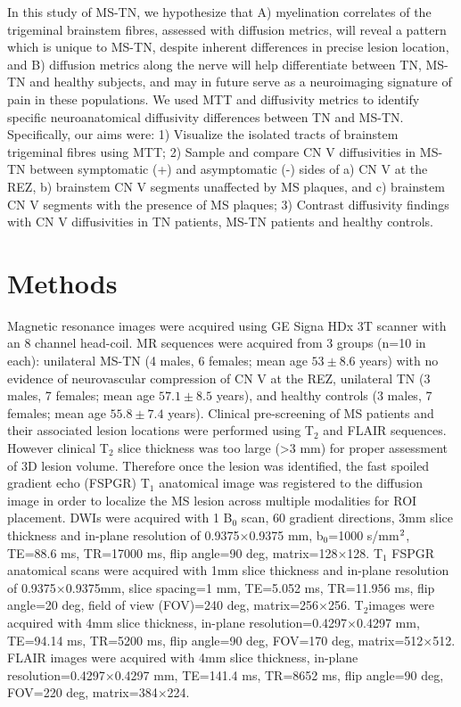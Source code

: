 In this study of MS-TN, we hypothesize that A) myelination correlates of the trigeminal brainstem fibres, assessed with diffusion metrics, will reveal a pattern which is unique to MS-TN, despite inherent differences in precise lesion location, and B) diffusion metrics along the nerve will help differentiate between TN, MS-TN and healthy subjects, and may in future serve as a neuroimaging signature of pain in these populations. 
We used MTT and diffusivity metrics to identify specific neuroanatomical diffusivity differences between TN and MS-TN. Specifically, our aims were: 1) Visualize the isolated tracts of brainstem trigeminal fibres using MTT; 2) Sample and compare CN V diffusivities in MS-TN between symptomatic (+) and asymptomatic (-) sides of a) CN V at the REZ, b) brainstem CN V segments unaffected by MS plaques, and c) brainstem CN V segments with the presence of MS plaques; 3) Contrast diffusivity findings with CN V diffusivities in TN patients, MS-TN patients and healthy controls.

\section{Methods}

Magnetic resonance images were acquired using GE Signa HDx 3T scanner with an 8 channel head-coil. MR sequences were acquired from 3 groups (n=10 in each): unilateral MS-TN (4 males, 6 females; mean age  $53\pm8.6$ years) with no evidence of neurovascular compression of CN V at the REZ, unilateral TN (3 males, 7 females; mean age $57.1\pm8.5$ years), and healthy controls (3 males, 7 females; mean age $55.8\pm7.4$ years). Clinical pre-screening of MS patients and their associated lesion locations were performed using T$_{2}$ and FLAIR sequences. However clinical T$_{2}$ slice thickness was too large (\textgreater 3 mm) for proper assessment of 3D lesion volume. Therefore once the lesion was identified, the fast spoiled gradient echo (FSPGR) T$_{1}$ anatomical image was registered to the diffusion image in order to localize the MS lesion across multiple modalities for ROI placement. DWIs were acquired with 1 B$_{0}$ scan, 60 gradient directions, 3mm slice thickness and in-plane resolution of 0.9375$\times$0.9375 mm, b$_{0}$=1000 s/mm$\textsuperscript{2}$, TE=88.6 ms, TR=17000 ms, flip angle=90 deg, matrix=128$\times$128. T$_{1}$ FSPGR anatomical scans were acquired with 1mm slice thickness and in-plane resolution of 0.9375$\times$0.9375mm, slice spacing=1 mm, TE=5.052 ms, TR=11.956 ms, flip angle=20 deg, field of view (FOV)=240 deg, matrix=256$\times$256. T$_{2}$images were acquired with 4mm slice thickness, in-plane resolution=0.4297$\times$0.4297 mm, TE=94.14 ms, TR=5200 ms, flip angle=90 deg, FOV=170 deg, matrix=512$\times$512. FLAIR images were acquired with 4mm slice thickness, in-plane resolution=0.4297$\times$0.4297 mm, TE=141.4 ms, TR=8652 ms, flip angle=90 deg, FOV=220 deg, matrix=384$\times$224.

